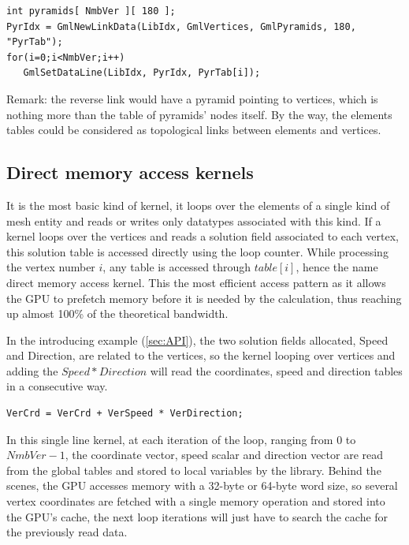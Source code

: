 \documentclass[a4paper,12pt]{article}
\begin{document}
\begin{tt}
\begin{verbatim}
int pyramids[ NmbVer ][ 180 ];
PyrIdx = GmlNewLinkData(LibIdx, GmlVertices, GmlPyramids, 180, "PyrTab");
for(i=0;i<NmbVer;i++)
   GmlSetDataLine(LibIdx, PyrIdx, PyrTab[i]);
\end{verbatim}
\end{tt}
\normalfont

Remark: the reverse link would have a pyramid pointing to vertices, which is nothing more than the table of pyramids' nodes itself. By the way, the elements tables could be considered as topological links between elements and vertices.

\subsection{Direct memory access kernels}
\label{sec:kernels_directs}
It is the most basic kind of kernel, it loops over the elements of a single kind of mesh entity and reads or writes only datatypes associated with this kind. If a kernel loops over the vertices and reads a solution field associated to each vertex, this solution table is accessed directly using the loop counter. While processing the vertex number $i$, any table is accessed through $table[i]$, hence the name direct memory access kernel. This the most efficient access pattern as it allows the GPU to prefetch memory before it is needed by the calculation, thus reaching up almost 100\% of the theoretical bandwidth.

In the introducing example (\ref{sec:API}), the two solution fields allocated, Speed and Direction, are related to the vertices, so the kernel looping over vertices and adding the $Speed * Direction$ will read the coordinates, speed and direction tables in a consecutive way.

\begin{tt}
\begin{verbatim}
VerCrd = VerCrd + VerSpeed * VerDirection;
\end{verbatim}
\end{tt}
\normalfont

In this single line kernel, at each iteration of the loop, ranging from $0$ to $NmbVer-1$, the coordinate vector, speed scalar and direction vector are read from the global tables and stored to local variables by the library. Behind the scenes, the GPU accesses memory with a 32-byte or 64-byte word size, so several vertex coordinates are fetched with a single memory operation and stored into the GPU's cache, the next loop iterations will just have to search the cache for the previously read data.
\end{document}
